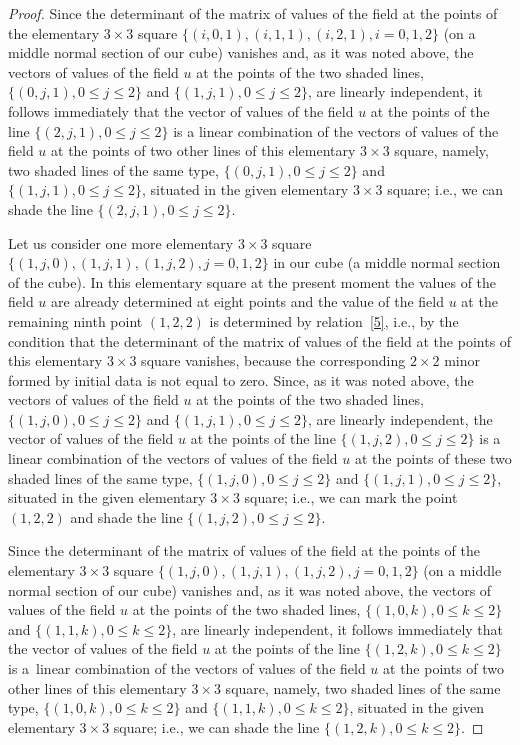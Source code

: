 \documentclass[pdftex]{sigma}
\begin{document}
\begin{proof}
Since the determinant of the matrix of values of the f\/ield at the
points of the elementary $3 \times 3$ square $\{(i, 0, 1), (i, 1,
1), (i, 2, 1), i = 0, 1, 2\}$ (on a middle normal section of our
cube) vanishes and, as it was noted above, the vectors of values of
the f\/ield $u$ at the points of the two shaded lines, $\{(0, j, 1), 0
\leq j \leq 2\}$ and $\{(1, j, 1), 0 \leq j \leq 2\}$, are linearly
independent, it follows immediately that the vector of values of the
f\/ield $u$ at the points of the line $\{(2, j, 1), 0 \leq j \leq 2\}$
is a linear combination of the vectors of values of the f\/ield $u$ at
the points of two other lines of this elementary $3 \times 3$
square, namely, two shaded lines of the same type, $\{(0, j, 1), 0
\leq j \leq 2\}$ and $\{(1, j, 1), 0 \leq j \leq 2\}$, situated in
the given elementary $3 \times 3$ square; i.e., we can shade the
line $\{(2, j, 1), 0 \leq j \leq 2\}$.


Let us consider one more elementary $3 \times 3$ square $\{(1, j,
0), (1, j, 1), (1, j, 2), j = 0, 1, 2\}$ in our cube (a middle
normal section of the cube). In this elementary square at the
present moment the values of the f\/ield $u$ are already determined at
eight points and the value of the f\/ield $u$ at the remaining ninth
point $(1, 2, 2)$ is determined by relation~\eqref{5}, i.e.,
by the condition that the determinant of the matrix of values of the
f\/ield at the points of this elementary $3 \times 3$ square vanishes,
because the corresponding $2 \times 2$ minor formed by initial data
is not equal to zero. Since, as it was noted above, the vectors of
values of the f\/ield $u$ at the points of the two shaded lines,
$\{(1, j, 0), 0 \leq j \leq 2\}$ and $\{(1, j, 1), 0 \leq j \leq
2\}$, are linearly independent, the vector of values of the f\/ield
$u$ at the points of the line $\{(1, j, 2), 0 \leq j \leq 2\}$ is a
linear combination of the vectors of values of the f\/ield $u$ at the
points of these two shaded lines of the same type, $\{(1, j, 0), 0
\leq j \leq 2\}$ and $\{(1, j, 1), 0 \leq j \leq 2\}$, situated in
the given elementary $3 \times 3$ square; i.e., we can mark the
point $(1, 2, 2)$ and shade the line $\{(1, j, 2), 0 \leq j \leq
2\}$.


Since the determinant of the matrix of values of the f\/ield at the
points of the elementary $3 \times 3$ square $\{(1, j, 0), (1, j,
1), (1, j, 2), j = 0, 1, 2\}$ (on a middle normal section of our
cube) vanishes and, as it was noted above, the vectors of values of
the f\/ield $u$ at the points of the two shaded lines, $\{(1, 0, k), 0
\leq k \leq 2\}$ and $\{(1, 1, k), 0 \leq k \leq 2\}$, are linearly
independent, it follows immediately that the vector of values of the
f\/ield $u$ at the points of the line $\{(1, 2, k), 0 \leq k \leq 2\}$
is a~linear combination of the vectors of values of the f\/ield $u$ at
the points of two other lines of this elementary $3 \times 3$
square, namely, two shaded lines of the same type, $\{(1, 0, k), 0
\leq k \leq 2\}$ and $\{(1, 1, k), 0 \leq k \leq 2\}$, situated in
the given elementary $3 \times 3$ square; i.e., we can shade the
line $\{(1, 2, k), 0 \leq k \leq 2\}$.



\end{proof}
\end{document}
